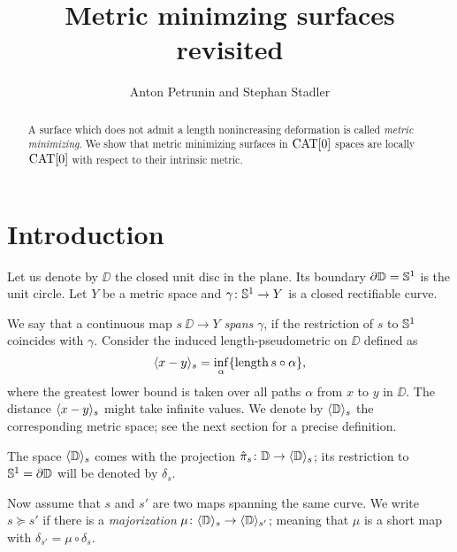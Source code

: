 \documentclass{article}
\begin{document}
\title{Metric minimzing surfaces revisited}
\author{Anton Petrunin and Stephan Stadler}

\date{}

\maketitle

\begin{abstract}
A surface which does not admit a length nonincreasing deformation is called \emph{metric minimizing}.
We show that metric minimizing surfaces in $\mathop{\rm CAT}\nolimits[0]$ spaces are locally $\mathop{\rm CAT}\nolimits[0]$ with respect to their intrinsic metric. 
\end{abstract}

\section{Introduction}

Let us denote by $\DD$ the closed unit disc in the plane.
Its boundary $\partial \mathbb{D}=\mathbb{S}^1$ is the unit circle.
Let $Y$ be a metric space and $\gamma\colon\mathbb{S}^1\to Y$ is a closed rectifiable curve.

We say that a continuous map $s\:\DD\to Y$ \emph{spans} $\gamma$,
if the restriction of $s$ to $\mathbb{S}^1$ coincides with $\gamma$.
Consider the induced length-pseudometric on $\DD$ defined as 
\[\langle x-y\rangle_s=\inf_\alpha\{\mathop{\rm length}\nolimits s\circ\alpha\},\]
where the greatest lower bound is taken over all paths $\alpha$ from $x$ to $y$ in $\DD$.
The distance $\langle x-y\rangle_s$ might take infinite values.
We denote by $\langle\mathbb{D}\rangle_s$ the corresponding metric space;
see the next section for a precise definition.

The space $\langle\mathbb{D}\rangle_s$ comes with the projection $ \hat\pi_s\colon\mathbb{D}\to\langle\mathbb{D}\rangle_s$;
its restriction to $\mathbb{S}^1=\partial\mathbb{D}$ will be denoted by $\delta_s$.

Now assume that $s$ and $s'$ are two maps spanning the same curve.
We write $s\succcurlyeq s'$ if there is a \emph{majorization}
$\mu\colon\langle\mathbb{D}\rangle_s\to \langle\mathbb{D}\rangle_{s'}$;
meaning that $\mu$ is a short map with $\delta_{s'}=\mu\circ\delta_s$.
\end{document}
